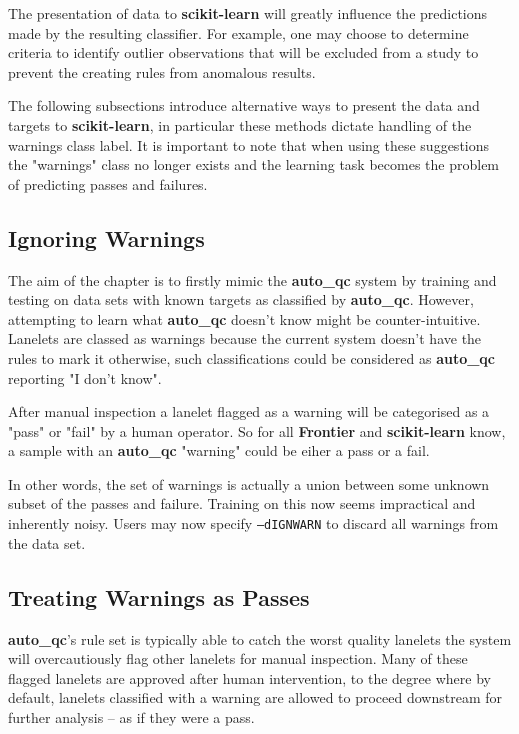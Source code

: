 The presentation of data to \textbf{scikit-learn} will greatly influence the
predictions made by the resulting classifier. For example, one may choose to
determine criteria to identify outlier observations that will be excluded from a
study to prevent the creating rules from anomalous results.

The following subsections introduce alternative ways to present the data and
targets to \textbf{scikit-learn}, in particular these methods dictate handling
of the warnings class label. It is important to note that when using these
suggestions the "warnings" class no longer exists and the learning task becomes
the problem of predicting passes and failures.

\subsection{Ignoring Warnings}

The aim of the chapter is to firstly mimic the \textbf{auto\_qc} system by
training and testing on data sets with known targets as classified by
\textbf{auto\_qc}. However, attempting to learn what \textbf{auto\_qc} doesn't
know might be counter-intuitive. Lanelets are classed as warnings because the
current system doesn't have the rules to mark it otherwise, such classifications
could be considered as \textbf{auto\_qc} reporting "I don't know".

After manual inspection a lanelet flagged as a warning will be categorised as a
"pass" or "fail" by a human operator. So for all \textbf{Frontier} and
\textbf{scikit-learn} know, a sample with an \textbf{auto\_qc} "warning" could
be eiher a pass or a fail.

In other words, the set of warnings is actually a union between some unknown
subset of the passes and failure. Training on this now seems impractical and
inherently noisy. Users may now specify \texttt{--dIGNWARN}
to discard all warnings from the data set.


\subsection{Treating Warnings as Passes}

\textbf{auto\_qc}'s rule set is typically able to catch the worst quality
lanelets the system will overcautiously flag other lanelets for manual
inspection. Many of these flagged lanelets are approved after human
intervention, to the degree where by default, lanelets classified with a warning
are allowed to proceed downstream for further analysis -- as if they were a
pass.

